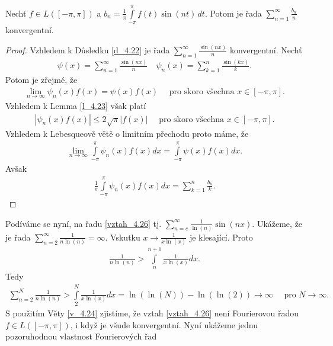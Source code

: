 \begin{theorem}\label{v_4.24}
Nechť $f \in L([-\pi, \pi])$ a $b_n = \frac{1}{\pi} \int \limits_{-\pi}^\pi f (t) \sin (nt) \, dt$. Potom je řada $\sum \limits _{n=1}^\infty \frac{b_n}{n}$ konvergentní.
\begin{proof}
Vzhledem k Důsledku \ref{d_4.22} je řada $\sum \limits _{n=1}^{\infty} \frac{\sin (nx)}{n}$ konvergentní. Nechť
\begin{align*}
\psi (x) = \sum \limits _{n=1}^{\infty} \frac{\sin (nx)}{n} \quad \psi_n (x) = \sum \limits _{k=1}^n \frac{\sin (kx)}{k}.
\end{align*}
Potom je zřejmé, že
\begin{align*}
\lim_{n \rightarrow \infty} \psi_n (x) f (x) = \psi (x) f (x) \quad \textrm{ pro skoro všechna } x \in [-\pi, \pi].
\end{align*}
Vzhledem k Lemma \ref{l_4.23} však platí
\begin{align*}
|\psi_n (x) f (x)| \leq 2 \sqrt{\pi} |f(x)| \quad \textrm{ pro skoro všechna } x \in [-\pi, \pi].
\end{align*}
Vzhledem k Lebesqueově větě o limitním přechodu proto máme, že
\begin{align*}
\lim_{n \rightarrow \infty} \int \limits_{-\pi}^\pi \psi_n (x) f (x) dx = \int \limits_{-\pi}^\pi \psi (x) f(x) dx.
\end{align*}
Avšak
\begin{align*}
\frac{1}{\pi} \int \limits_{-\pi}^\pi \psi_n (x) f (x) dx = \sum \limits _{k=1}^n \frac{b_k}{k}.
\end{align*}
\end{proof}
\end{theorem}

Podíváme se nyní, na řadu \eqref{vztah_4.26} tj. $\sum \limits _{n=e}^\infty \frac{1}{\ln (n)} \sin (nx)$. Ukážeme, že je řada $\sum \limits _{n=2}^\infty \frac{1}{n \ln(n)} = \infty$. Vskutku $x \rightarrow \frac{1}{x \ln (x)}$ je klesající. Proto
\begin{align*}
\frac{1}{n \ln (n)} > \int \limits_n^{n+1} \frac{1}{x \ln (x)} dx.
\end{align*}
Tedy
\begin{align*}
\sum \limits _{n=2}^N \frac{1}{n \ln (n)} > \int \limits_2^N \frac{1}{x \ln (x)} dx = \ln (\ln (N)) - \ln (\ln (2)) \rightarrow \infty \quad \textrm{ pro } N \rightarrow \infty.
\end{align*}
S použitím Věty \ref{v_4.24} zjistíme, že vztah \eqref{vztah_4.26} není Fourierovou řadou $f \in L ([-\pi, \pi])$, i když je všude konvergentní. Nyní ukážeme jednu pozoruhodnou vlastnost Fourierových řad

